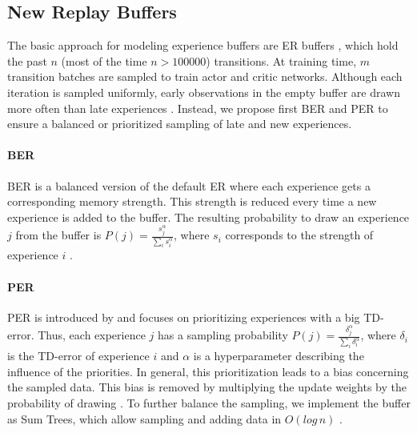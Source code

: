 \subsection{New Replay Buffers} \label{sec:buffers}

The basic approach for modeling experience buffers are \ac{ER} buffers \cite{lin1992ER}, which hold the past $n$ (most of the time $n>100000$) transitions. At training time, $m$ transition batches are sampled to train actor and critic networks. Although each iteration is sampled uniformly, early observations in the empty buffer  are drawn more often than late experiences \cite{schaul2015prioritized}. Instead, we propose first \ac{BER} \cite{Sun2022:BPER} and  \ac{PER} \cite{schaul2015prioritized} to ensure a balanced or prioritized sampling of late and new experiences.

\paragraph{\acl{BER}} \ac{BER} \cite{Sun2022:BPER} is a balanced version of the default \ac{ER} where each experience gets a corresponding memory strength. This strength is reduced every time a new experience is added to the  buffer. The resulting probability to draw an experience $j$ from the buffer is $P(j) = \frac{s_j^\alpha}{\sum_{i}s_i^\alpha}$, where $s_i$ corresponds to the strength of experience $i$ \cite{Sun2022:BPER}.

\paragraph{\acl{PER}} \ac{PER} is introduced by \cite{schaul2015prioritized} and focuses on prioritizing experiences with a big \ac{TD}-error. Thus, each experience $j$ has a sampling probability $P(j) = \frac{\delta_j^\alpha}{\sum_{i}\delta_i^\alpha}$, where $\delta_i$ is the \ac{TD}-error of experience $i$ and $\alpha$ is a hyperparameter describing the influence of the priorities. In general, this prioritization leads to a bias concerning the sampled data. This bias is removed by multiplying the update weights by the probability of drawing \cite{schaul2015prioritized}. To further balance the sampling, we implement the buffer as Sum Trees, which allow sampling and adding data in $O(log\,n)$  \cite{schaul2015prioritized}.

